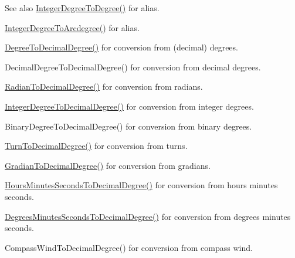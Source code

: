 \begin{DoxySeeAlso}{See also}
\mbox{\hyperlink{group___e_g_x_math-_angle_conversions-_integer_degree_gaa9b63c6095fd7f8809fcfa2ba1e62235}{Integer\+Degree\+To\+Degree()}} for alias. 

\mbox{\hyperlink{group___e_g_x_math-_angle_conversions-_integer_degree_gaf633d0b82bfb7586ce86ffbcf78d8f7a}{Integer\+Degree\+To\+Arcdegree()}} for alias. 

\mbox{\hyperlink{group___e_g_x_math-_angle_conversions-_degree_ga568afc1d436d425bf5d4edea584aee08}{Degree\+To\+Decimal\+Degree()}} for conversion from (decimal) degrees. 

Decimal\+Degree\+To\+Decimal\+Degree() for conversion from decimal degrees. 

\mbox{\hyperlink{group___e_g_x_math-_angle_conversions-_radian_ga6d170f1882c32de53167c04524d05f67}{Radian\+To\+Decimal\+Degree()}} for conversion from radians. 

\mbox{\hyperlink{group___e_g_x_math-_angle_conversions-_integer_degree_gac219c3198508ba984d8d81d22831b27d}{Integer\+Degree\+To\+Decimal\+Degree()}} for conversion from integer degrees. 

Binary\+Degree\+To\+Decimal\+Degree() for conversion from binary degrees. 

\mbox{\hyperlink{group___e_g_x_math-_angle_conversions-_turn_ga79231536255e77fb7a158b99a30c1767}{Turn\+To\+Decimal\+Degree()}} for conversion from turns. 

\mbox{\hyperlink{group___e_g_x_math-_angle_conversions-_gradian_ga346f47c519d5261b689cec49f4a8e789}{Gradian\+To\+Decimal\+Degree()}} for conversion from gradians. 

\mbox{\hyperlink{group___e_g_x_math-_angle_conversions-_hours_minutes_seconds_gad6662d1113ae8aea6baca6317888b4cd}{Hours\+Minutes\+Seconds\+To\+Decimal\+Degree()}} for conversion from hours minutes seconds. 

\mbox{\hyperlink{group___e_g_x_math-_angle_conversions-_degrees_minutes_seconds_gab4d4c25623f86611692c39eb29f16141}{Degrees\+Minutes\+Seconds\+To\+Decimal\+Degree()}} for conversion from degrees minutes seconds. 

Compass\+Wind\+To\+Decimal\+Degree() for conversion from compass wind. 
\end{DoxySeeAlso}
\mbox{\label{group___e_g_x_math-_angle_conversions-_integer_degree_gaa9b63c6095fd7f8809fcfa2ba1e62235}} 
